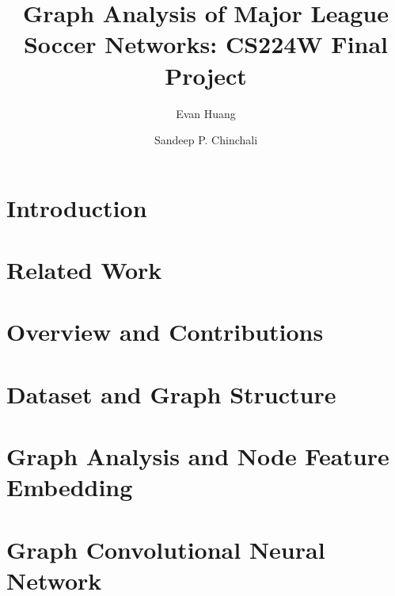 \documentclass[newfonts=false,format=sigconf,10pt,letterpaper]{acmart}
\begin{document}

\title{Graph Analysis of Major League Soccer Networks: CS224W Final Project}

\author{Evan Huang}

\author{Sandeep P. Chinchali}

\maketitle

\section{Introduction}
\label{sec:introduction}


\section{Related Work}
\label{sec:related_work}



\section{Overview and Contributions}
\label{sec:outline}


\section{Dataset and Graph Structure}
\label{sec:dataset}


\section{Graph Analysis and Node Feature Embedding}
\label{sec:graph_analysis}


\section{Graph Convolutional Neural Network}
\label{sec:graph_GCN}

\end{document}
